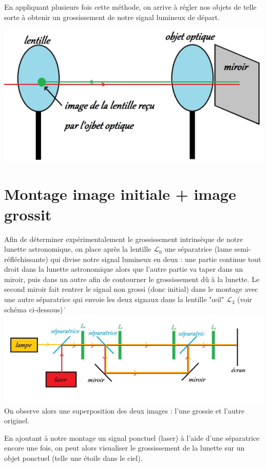\documentclass[12pt,a4paper]{article}
\begin{document}
	En appliquant plusieurs fois cette méthode, on arrive à régler nos objets de telle sorte à obtenir un grossissement de notre signal lumineux de départ.
	
	\includegraphics[scale=0.6]{schema1}
	
	\section{Montage image initiale + image grossit}
	Afin de déterminer expérimentalement le grossissement intrinsèque de notre lunette astronomique, on place après la lentille $\mathcal{L}_{0}$ une séparatrice (lame semi-réfléchissante) qui divise notre signal lumineux en deux : une partie continue tout droit dans la lunette astronomique alors que l'autre partie va taper dans un miroir, puis dans un autre afin de contourner le grossissement dû à la lunette. Le second miroir fait rentrer le signal non grossi (donc initial) dans le montage avec une autre séparatrice qui envoie les deux signaux dans la lentille "œil" $\mathcal{L}_{3}$ (voir schéma ci-dessous)\.\
	\includegraphics[scale=0.7]{schema3}\\
	On observe alors une superposition des deux images : l'une grossie et l'autre originel. 
	
	En ajoutant à notre montage un signal ponctuel (laser) à l'aide d'une séparatrice encore une fois, on peut alors visualiser le grossissement de la lunette sur un objet ponctuel (telle une étoile dans le ciel).
	
\end{document}
